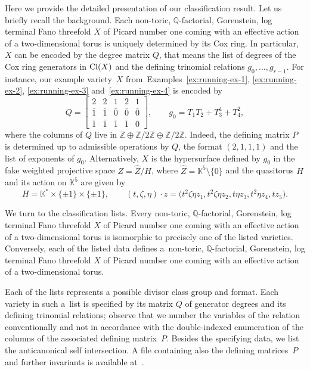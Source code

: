 \documentclass[10pt,a4paper]{amsart}
\theoremstyle{definition}
\def\Cl{{\rm Cl}}
\def\KK{{\mathbb K}}
\def\ZZ{{\mathbb Z}}
\def\QQ{{\mathbb Q}}
\numberwithin{equation}{section}
\begin{document}
Here we provide the detailed presentation
of our classification result.
Let us briefly recall the background.
Each non-toric, $\QQ$-factorial, Gorenstein,
log terminal Fano threefold $X$ of Picard number
one coming with an effective action of a
two-dimensional torus is uniquely determined
by its Cox ring.
In particular, $X$ can be encoded by the degree
matrix $Q$, that means the list of degrees
of the Cox ring generators in $\Cl(X)$
and the defining trinomial relations
$g_0,\dots,g_{r-1}$.
For instance, our example variety~$X$
from~Examples~\ref{ex:running-ex-1},
\ref{ex:running-ex-2},
\ref{ex:running-ex-3}
and~\ref{ex:running-ex-4} is encoded by
\[
Q =
\begin{bmatrix}
2 & 2 & 1 & 2 & 1
\\
\bar 1 & \bar 1 & \bar 0 & \bar 0 & \bar 0
\\
\bar 1 & \bar 1 & \bar 1 & \bar 1 & \bar 0
\end{bmatrix}\!,
\qquad
g_0 = T_1T_2 + T_3^4 + T_4^2 ,
\]
where the columns of $Q$ live in
$\ZZ \oplus \ZZ/2\ZZ \oplus \ZZ / 2\ZZ$.
Indeed, the defining matrix $P$ is determined
up to admissible operations by $Q$, the
format $(2,1,1,1)$ and the list of exponents
of $g_0$.
Alternatively, $X$ is the hypersurface defined
by $g_0$ in the fake weighted projective
space $Z = \hat Z / H$, where
$\hat Z = \KK^5 \setminus \{0\}$
and the quasitorus $H$ and its action on $\KK^5$
are given by
\[
H = \KK^* \times \{\pm 1\} \times \{\pm 1\},\qquad
(t,\zeta,\eta) \cdot z =
\big(t^2\zeta\eta z_1, t^2\zeta\eta z_2, t\eta z_3,t^2\eta z_4, t z_5\big).
\]

We turn to the classification lists.
Every non-toric, $\QQ$-factorial, Gorenstein,
log terminal Fano threefold $X$ of Picard number
one coming with an effective action of a
two-dimensional torus is isomorphic to
precisely one of the listed varieties.
Conversely, each of the listed data defines a~non-toric, $\QQ$-factorial, Gorenstein,
log terminal Fano threefold $X$ of Picard number
one coming with an effective action of a
two-dimensional torus.

Each of the lists represents a possible
divisor class group and format.
Each variety in such a~list is specified
by its matrix $Q$ of generator degrees and
its defining trinomial relations; observe
that we number the variables of the relation
conventionally and not in accordance with
the double-indexed enumeration of the columns
of the associated defining matrix~$P$.
Besides the specifying data, we list the
anticanonical self intersection.
A file containing also the defining
matrices~$P$ and further invariants is
available at~\cite{BaHa}.
\end{document}
